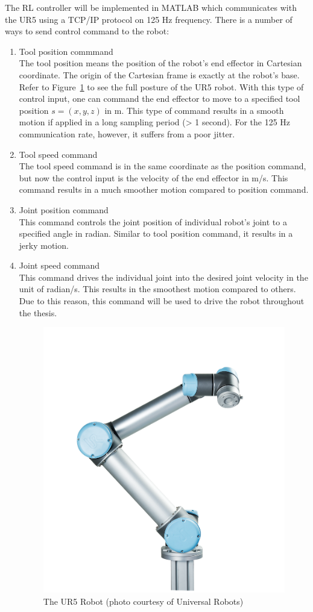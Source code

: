 The \acs {RL} controller will be implemented in MATLAB which communicates with the UR5 using a TCP/IP protocol on 125 Hz frequency. There is a number of ways to send control command to the robot:
\begin{enumerate}
\item Tool position commmand \\
The tool position means the position of the robot's end effector in Cartesian coordinate. The origin of the Cartesian frame is exactly at the robot's base. Refer to Figure~\ref{fig:UR5_Robot01} to see the full posture of the UR5 robot. With this type of control input, one can command the end effector to move to a specified tool position $ s = (x, y, z) $ in m. This type of command results in a smooth motion if applied in a long sampling period (> 1 second). For the 125 Hz communication rate, however, it suffers from a poor jitter.

\item Tool speed command \\
The tool speed command is in the same coordinate as the position command, but now the control input is the velocity of the end effector in m/s. This command results in a much smoother motion compared to position command.

\item Joint position command \\
This command controls the joint position of individual robot's joint to a specified angle in radian. Similar to tool position command, it results in a jerky motion. 

\item Joint speed command \\
This command drives the individual joint into the desired joint velocity in the unit of radian/s. This results in the smoothest motion compared to others. Due to this reason, this command will be used to drive the robot throughout the thesis.

\begin{figure}
\centering
\includegraphics[width=0.5\linewidth]{UR5_Robot01}
\caption{The UR5 Robot (photo courtesy of Universal Robots)}
\label{fig:UR5_Robot01}
\end{figure}
 
\end{enumerate}


